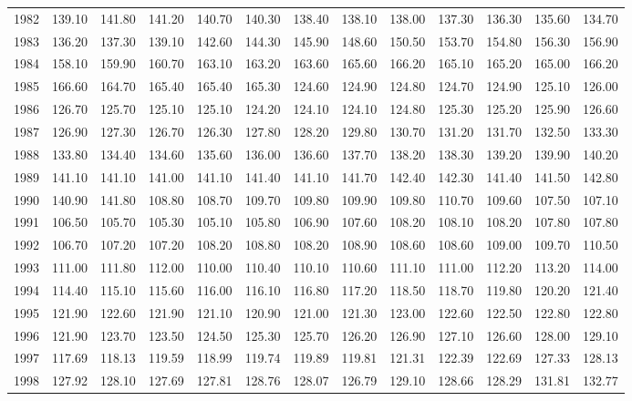 \begin{longtable}{rrrrrrrrrrrrr}
  1982 & 139.10 & 141.80 & 141.20 & 140.70 & 140.30 & 138.40 & 138.10 & 138.00 & 137.30 & 136.30 & 135.60 & 134.70 \\ 
  1983 & 136.20 & 137.30 & 139.10 & 142.60 & 144.30 & 145.90 & 148.60 & 150.50 & 153.70 & 154.80 & 156.30 & 156.90 \\ 
  1984 & 158.10 & 159.90 & 160.70 & 163.10 & 163.20 & 163.60 & 165.60 & 166.20 & 165.10 & 165.20 & 165.00 & 166.20 \\ 
  1985 & 166.60 & 164.70 & 165.40 & 165.40 & 165.30 & 124.60 & 124.90 & 124.80 & 124.70 & 124.90 & 125.10 & 126.00 \\ 
  1986 & 126.70 & 125.70 & 125.10 & 125.10 & 124.20 & 124.10 & 124.10 & 124.80 & 125.30 & 125.20 & 125.90 & 126.60 \\ 
  1987 & 126.90 & 127.30 & 126.70 & 126.30 & 127.80 & 128.20 & 129.80 & 130.70 & 131.20 & 131.70 & 132.50 & 133.30 \\ 
  1988 & 133.80 & 134.40 & 134.60 & 135.60 & 136.00 & 136.60 & 137.70 & 138.20 & 138.30 & 139.20 & 139.90 & 140.20 \\ 
  1989 & 141.10 & 141.10 & 141.00 & 141.10 & 141.40 & 141.10 & 141.70 & 142.40 & 142.30 & 141.40 & 141.50 & 142.80 \\ 
  1990 & 140.90 & 141.80 & 108.80 & 108.70 & 109.70 & 109.80 & 109.90 & 109.80 & 110.70 & 109.60 & 107.50 & 107.10 \\ 
  1991 & 106.50 & 105.70 & 105.30 & 105.10 & 105.80 & 106.90 & 107.60 & 108.20 & 108.10 & 108.20 & 107.80 & 107.80 \\ 
  1992 & 106.70 & 107.20 & 107.20 & 108.20 & 108.80 & 108.20 & 108.90 & 108.60 & 108.60 & 109.00 & 109.70 & 110.50 \\ 
  1993 & 111.00 & 111.80 & 112.00 & 110.00 & 110.40 & 110.10 & 110.60 & 111.10 & 111.00 & 112.20 & 113.20 & 114.00 \\ 
  1994 & 114.40 & 115.10 & 115.60 & 116.00 & 116.10 & 116.80 & 117.20 & 118.50 & 118.70 & 119.80 & 120.20 & 121.40 \\ 
  1995 & 121.90 & 122.60 & 121.90 & 121.10 & 120.90 & 121.00 & 121.30 & 123.00 & 122.60 & 122.50 & 122.80 & 122.80 \\ 
  1996 & 121.90 & 123.70 & 123.50 & 124.50 & 125.30 & 125.70 & 126.20 & 126.90 & 127.10 & 126.60 & 128.00 & 129.10 \\ 
  1997 & 117.69 & 118.13 & 119.59 & 118.99 & 119.74 & 119.89 & 119.81 & 121.31 & 122.39 & 122.69 & 127.33 & 128.13 \\ 
  1998 & 127.92 & 128.10 & 127.69 & 127.81 & 128.76 & 128.07 & 126.79 & 129.10 & 128.66 & 128.29 & 131.81 & 132.77 \\ 

\end{longtable}
